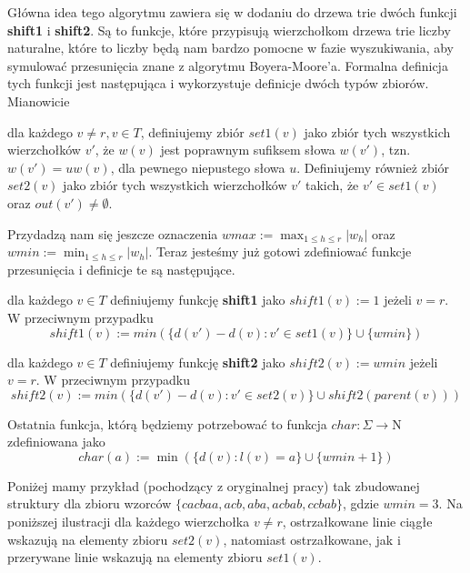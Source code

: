 Główna idea tego algorytmu zawiera się w dodaniu do drzewa trie dwóch funkcji \textbf{shift1} i \textbf{shift2}. Są to funkcje, które przypisują wierzchołkom drzewa trie liczby naturalne, które to liczby będą nam bardzo pomocne w fazie wyszukiwania, aby symulować przesunięcia znane z algorytmu Boyera-Moore'a. Formalna definicja tych funkcji jest następująca i wykorzystuje definicje dwóch typów zbiorów. Mianowicie 

\begin{definition}{}{}
dla każdego $v \not = r, v \in T$, definiujemy
zbiór $set1(v)$ jako zbiór tych wszystkich wierzchołków $v'$, że $w(v)$ jest poprawnym sufiksem słowa $w(v')$, tzn. $w(v') = uw(v)$, dla pewnego niepustego słowa $u$. Definiujemy również zbiór $set2(v)$ jako zbiór tych wszystkich wierzchołków $v'$ takich, że $v' \in set1(v)$ oraz $out(v') \not = \emptyset$. 
\end{definition}

\noindent Przydadzą nam się jeszcze oznaczenia $wmax := \max_{1 \leq h \leq r}|w_h|$ oraz $wmin := \min_{1 \leq h \leq r}|w_h|$. Teraz jesteśmy już gotowi zdefiniować funkcje przesunięcia i definicje te są następujące.

\begin{definition}{}{}
dla każdego $v \in T$ definiujemy funkcję \textbf{shift1} jako $shift1(v) := 1$ jeżeli $v=r$. W przeciwnym przypadku $$shift1(v) :=  min \left( \{d(v')-d(v) : v' \in set1(v) \} \cup \{wmin\}\right)$$
\end{definition}

\begin{definition}{}{}
dla każdego $v \in T$ definiujemy funkcję \textbf{shift2} jako $shift2(v) := wmin$ jeżeli $v=r$. W przeciwnym przypadku $$shift2(v) :=  min \left( \{d(v')-d(v) : v' \in set2(v) \} \cup shift2(parent(v))\right)$$
\end{definition}

\noindent Ostatnia funkcja, którą będziemy potrzebować to funkcja $char: \Sigma \longrightarrow \mathrm{N}$ zdefiniowana jako $$char(a) := \min (\{ d(v) : l(v) = a \} \cup \{ wmin+1 \})$$

\noindent Poniżej mamy przykład (pochodzący z oryginalnej pracy) tak zbudowanej struktury dla zbioru wzorców $\{cacbaa, acb, aba, acbab, ccbab\}$, gdzie $wmin = 3$. Na poniższej ilustracji dla każdego wierzchołka $v \not = r$, ostrzałkowane linie ciągłe wskazują na elementy zbioru $set2(v)$, natomiast ostrzałkowane, jak i przerywane linie wskazują na elementy zbioru $set1(v)$.

